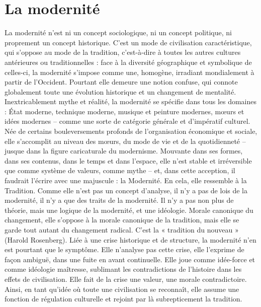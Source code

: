 \section{La modernité}
 





La modernité n'est ni un concept sociologique, ni un concept politique, ni proprement un concept historique. C'est un mode de civilisation caractéristique, qui s'oppose au mode de la tradition, c'est-à-dire à toutes les autres cultures antérieures ou traditionnelles : face à la diversité géographique et symbolique de celles-ci, la modernité s'impose comme une, homogène, irradiant mondialement à partir de l'Occident. Pourtant elle demeure une notion confuse, qui connote globalement toute une évolution historique et un changement de mentalité.
Inextricablement mythe et réalité, la modernité se spécifie dans tous les domaines : État moderne, technique moderne, musique et peinture modernes, mœurs et idées modernes – comme une sorte de catégorie générale et d'impératif culturel. Née de certains bouleversements profonds de l'organisation économique et sociale, elle s'accomplit au niveau des mœurs, du mode de vie et de la quotidienneté – jusque dans la figure caricaturale du modernisme. Mouvante dans ses formes, dans ses contenus, dans le temps et dans l'espace, elle n'est stable et irréversible que comme système de valeurs, comme mythe – et, dans cette acception, il faudrait l'écrire avec une majuscule : la Modernité. En cela, elle ressemble à la Tradition.
Comme elle n'est pas un concept d'analyse, il n'y a pas de lois de la modernité, il n'y a que des traits de la modernité. Il n'y a pas non plus de théorie, mais une logique de la modernité, et une idéologie. Morale canonique du changement, elle s'oppose à la morale canonique de la tradition, mais elle se garde tout autant du changement radical. C'est la
« tradition du nouveau » (Harold Rosenberg). Liée à une crise historique et de structure, la modernité n'en est pourtant que le symptôme. Elle n'analyse pas cette crise, elle l'exprime de façon ambiguë, dans une fuite en avant continuelle. Elle joue comme idée-force et comme idéologie maîtresse, sublimant les contradictions de l'histoire dans les effets de civilisation. Elle fait de la crise une valeur, une morale contradictoire. Ainsi, en tant qu'idée où toute une civilisation se reconnaît, elle assume une fonction de régulation culturelle et rejoint par là subrepticement la tradition.

